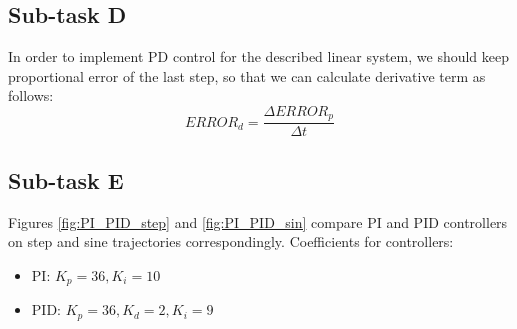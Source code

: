 \documentclass[12pt,letterpaper]{article}
\begin{document}
\subsection*{Sub-task D}
In order to implement PD control for the described linear system, we should keep proportional error of the last step, so that we can calculate derivative term as follows:
\begin{equation*}
    ERROR_d = \frac{\Delta ERROR_p}{\Delta t}
\end{equation*}

\newpage
\subsection*{Sub-task E}
    Figures \ref{fig:PI_PID_step} and \ref{fig:PI_PID_sin} compare PI and PID controllers on step and sine trajectories correspondingly.
    Coefficients for controllers:
    \begin{itemize}
        \item PI: $K_p = 36, K_i = 10$
        \item PID: $K_p = 36, K_d = 2, K_i = 9$
    \end{itemize}
    
\end{document}
